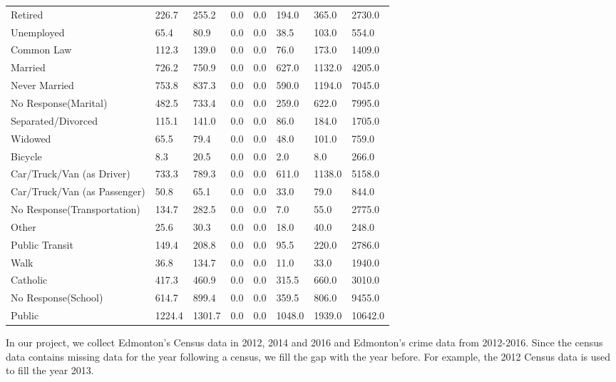 \documentclass{article}
\begin{document}
\begin{table}[h]
{\begin{tabular}{@{}llllllll@{}}
Retired                      & 226.7  & 255.2  & 0.0 & 0.0  & 194.0  & 365.0  & 2730.0  \\
Unemployed                   & 65.4   & 80.9   & 0.0 & 0.0  & 38.5   & 103.0  & 554.0   \\
Common Law                   & 112.3  & 139.0  & 0.0 & 0.0  & 76.0   & 173.0  & 1409.0  \\
Married                      & 726.2  & 750.9  & 0.0 & 0.0  & 627.0  & 1132.0 & 4205.0  \\
Never Married                & 753.8  & 837.3  & 0.0 & 0.0  & 590.0  & 1194.0 & 7045.0  \\
No Response(Marital)         & 482.5  & 733.4  & 0.0 & 0.0  & 259.0  & 622.0  & 7995.0  \\
Separated/Divorced           & 115.1  & 141.0  & 0.0 & 0.0  & 86.0   & 184.0  & 1705.0  \\
Widowed                      & 65.5   & 79.4   & 0.0 & 0.0  & 48.0   & 101.0  & 759.0   \\
Bicycle                      & 8.3    & 20.5   & 0.0 & 0.0  & 2.0    & 8.0    & 266.0   \\
Car/Truck/Van (as Driver)    & 733.3  & 789.3  & 0.0 & 0.0  & 611.0  & 1138.0 & 5158.0  \\
Car/Truck/Van (as Passenger) & 50.8   & 65.1   & 0.0 & 0.0  & 33.0   & 79.0   & 844.0   \\
No Response(Transportation)  & 134.7  & 282.5  & 0.0 & 0.0  & 7.0    & 55.0   & 2775.0  \\
Other                        & 25.6   & 30.3   & 0.0 & 0.0  & 18.0   & 40.0   & 248.0   \\
Public Transit               & 149.4  & 208.8  & 0.0 & 0.0  & 95.5   & 220.0  & 2786.0  \\
Walk                         & 36.8   & 134.7  & 0.0 & 0.0  & 11.0   & 33.0   & 1940.0  \\
Catholic                     & 417.3  & 460.9  & 0.0 & 0.0  & 315.5  & 660.0  & 3010.0  \\
No Response(School)          & 614.7  & 899.4  & 0.0 & 0.0  & 359.5  & 806.0  & 9455.0  \\
Public                       & 1224.4 & 1301.7 & 0.0 & 0.0  & 1048.0 & 1939.0 & 10642.0 \\ \bottomrule
\end{tabular}}
\end{table}

In our project, we collect Edmonton’s Census data in 2012, 2014 and 2016 and Edmonton’s crime data from 2012-2016. Since the census data contains missing data for the year following a census, we fill the gap with the year before. For example, the 2012 Census data is used to fill the year 2013.
\end{document}
